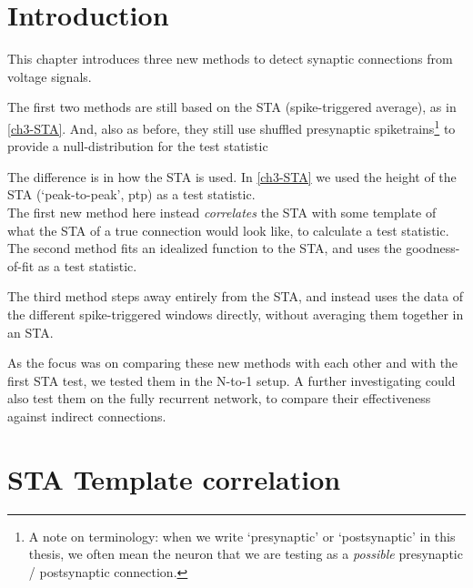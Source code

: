 
\section{Introduction}

This chapter introduces three new methods to detect synaptic connections from voltage signals.

The first two methods are still based on the STA (spike-triggered average), as in \cref{ch3-STA}. And, also as before, they still use shuffled presynaptic spiketrains\footnote{
    A note on terminology: when we write `presynaptic' or `postsynaptic' in this thesis, we often mean the neuron that we are testing as a \emph{possible} presynaptic / postsynaptic connection.
}
to provide a null-distribution for the test statistic

The difference is in how the STA is used. In \cref{ch3-STA} we used the height of the STA (`peak-to-peak', ptp) as a test statistic.\\
The first new method here instead \emph{correlates} the STA with some template of what the STA of a true connection would look like, to calculate a test statistic.\\
The second method fits an idealized function to the STA, and uses the goodness-of-fit as a test statistic.

The third method steps away entirely from the STA, and instead uses the data of the different spike-triggered windows directly, without averaging them together in an STA.

As the focus was on comparing these new methods with each other and with the first STA test, we tested them in the N-to-1 setup. A further investigating could also test them on the fully recurrent network, to compare their effectiveness against indirect connections.


\clearpage
\section{STA Template correlation}
\label{sec:method-STA-template-corr}


